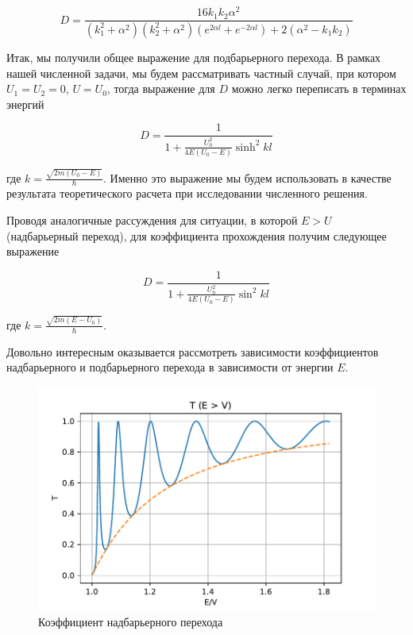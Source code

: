 \documentclass[a4paper, 12pt]{article}
\begin{document}
    \begin{equation}
        D = \frac{16 k_1 k_2 \alpha^2}{(k_1^2 + \alpha^2)(k_2^2 + \alpha^2)(e^{2\alpha l} + e^{-2\alpha l}) + 2(\alpha^2 - k_1 k_2)}
    \end{equation}

    Итак, мы получили общее выражение для подбарьерного перехода. В рамках нашей численной задачи, мы будем рассматривать
    частный случай, при котором $U_1 = U_2 = 0$, $U = U_0$, тогда выражение для $D$ можно легко переписать в терминах 
    энергий

    \begin{equation}
        D = \frac{1}{1 + \frac{U_0^2}{4 E (U_0 - E)}\sinh^2 {k l}}
    \end{equation}

    где $\displaystyle k = \frac{\sqrt{2m (U_0 - E)}}{\hbar}$. Именно это выражение мы будем использовать в качестве
    результата теоретического расчета при исследовании численного решения. 

    Проводя аналогичные рассуждения для ситуации, в которой $E > U$ (надбарьерный переход), для коэффициента прохождения получим
    следующее выражение

    \begin{equation}
        D = \frac{1}{1 + \frac{U_0^2}{4 E (U_0 - E)}\sin^2 {k l}}
    \end{equation}

    где $\displaystyle k = \frac{\sqrt{2m (E - U_0)}}{\hbar}$.

    Довольно интересным оказывается рассмотреть зависимости коэффициентов надбарьерного и подбарьерного перехода в зависимости от
    энергии $E$.

    \begin{figure}
        \centering
        \includegraphics{images/TransmissionPropability1.pdf}
        \caption{Коэффициент надбарьерного перехода}
        \label{fig:TransmissionPropability1}
    \end{figure}
\end{document}
